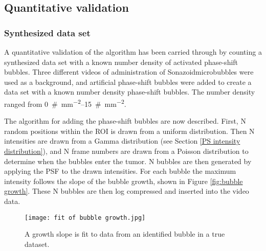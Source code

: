 \subsection{Quantitative validation}
\subsubsection{Synthesized data set}
A quantitative validation of the algorithm has been carried through by counting a synthesized data set with a known number density of activated phase-shift bubbles. Three different videos of administration of Sonazoid\texttrademark microbubbles were used as a background, and artificial phase-shift bubbles were added to create a data set with a known number density phase-shift bubbles. The number density ranged from \SIrange[per-mode=symbol]{0}{15}{\#\per\milli\meter\squared}.


The algorithm for adding the phase-shift bubbles are now described. First, N random positions within the ROI is drawn from a uniform distribution. Then N intensities are drawn from a Gamma distribution (see Section \ref{PS intensity distribution}), and N frame numbers are drawn from a Poisson distribution to determine when the bubbles enter the tumor. N bubbles are then generated by applying the PSF to the drawn intensities. For each bubble the maximum intensity follows the slope of the bubble growth, shown in Figure \ref{fig:bubble growth}. These N bubbles are then log compressed and inserted into the video data. 


\begin{figure}[h]
  \centering
  \label{Fig:growth slope}
  \texttt{[image: fit of bubble growth.jpg]}
  \caption{A growth slope is fit to data from an identified bubble in a true dataset.}
\end{figure}


